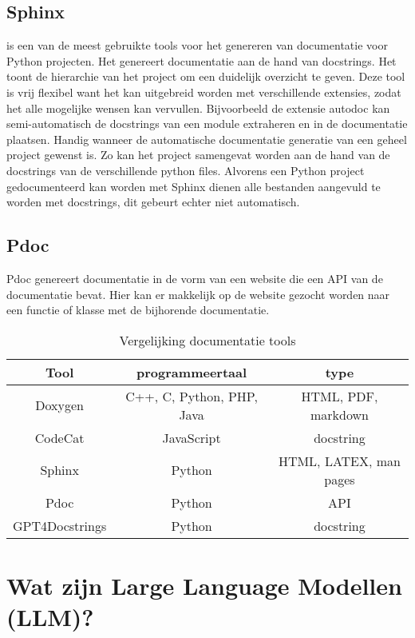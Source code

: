 \subsection{Sphinx}
\textcite{Sphinx2023} is een van de meest gebruikte tools voor het genereren van documentatie voor Python projecten.
Het genereert documentatie aan de hand van docstrings. Het toont de hierarchie van het project om een duidelijk overzicht te geven.
Deze tool is vrij flexibel want het kan uitgebreid worden met verschillende extensies, zodat het alle mogelijke wensen kan vervullen.
Bijvoorbeeld de extensie autodoc kan semi-automatisch de docstrings van een module extraheren en in de documentatie plaatsen. 
Handig wanneer de automatische documentatie generatie van een geheel project gewenst is. Zo kan het project samengevat worden aan de hand van de docstrings van de verschillende python files. 
Alvorens een Python project gedocumenteerd kan worden met Sphinx dienen alle bestanden aangevuld te worden met docstrings, dit gebeurt echter niet automatisch.

\subsection{Pdoc}
Pdoc \autocite{GallantHils2023} genereert documentatie in de vorm van een website die een API van de documentatie bevat. 
Hier kan er makkelijk op de website gezocht worden naar een functie of klasse met de bijhorende documentatie.

\begin{table}[h!]
\centering
\small
\begin{tabular}{|c|c|c|}
\hline
Tool & programmeertaal & type \\ [0.5ex]
\hline
Doxygen & C++, C, Python, PHP, Java & HTML, PDF, markdown\\
\hline
CodeCat & JavaScript & docstring \\
\hline
Sphinx & Python & HTML, LATEX, man pages \\
\hline
Pdoc & Python & API \\
\hline
GPT4Docstrings & Python & docstring \\
\hline
\end{tabular}
\caption{Vergelijking documentatie tools}
\label{table:vgl-tools}
\end{table}

\section{Wat zijn Large Language Modellen (LLM)?}
\label{sec:wat-zijn-llms}

